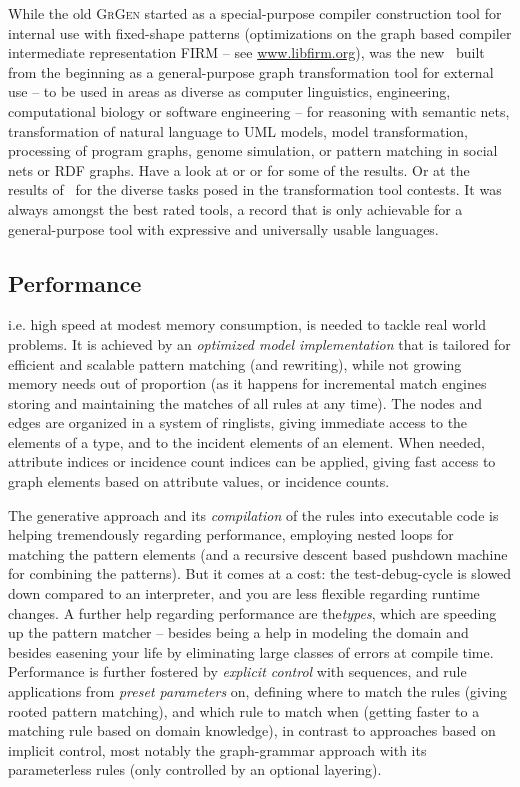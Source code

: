 While the old \textsc{GrGen} started as a special-purpose compiler construction tool for internal use with fixed-shape patterns 
(optimizations on the graph based compiler intermediate representation FIRM -- see \url{www.libfirm.org}),
was the new \GrG\ built from the beginning as a general-purpose graph transformation tool for external use
-- to be used in areas as diverse as computer linguistics, engineering, computational biology or software engineering --
for reasoning with semantic nets, transformation of natural language to UML models,
model transformation, processing of program graphs, genome simulation, or pattern matching in social nets or RDF graphs.
Have a look at \cite{usecomputerlinguistics} or \cite{usemodeltransformation} or \cite{usegeneexpression} for some of the results.
Or at the results of \GrG\ for the diverse tasks posed in the transformation tool contests. 
It was always amongst the best rated tools, a record that is only achievable for a general-purpose tool with expressive and universally usable languages.

\subsection*{Performance}
i.e. high speed at modest memory consumption, is needed to tackle real world problems.
It is achieved by an \emph{optimized model implementation} that is tailored for efficient and scalable pattern matching (and rewriting),
while not growing memory needs out of proportion (as it happens for incremental match engines storing and maintaining the matches of all rules at any time).
The nodes and edges are organized in a system of ringlists, giving immediate access to the elements of a type, and to the incident elements of an element.
When needed, attribute indices or incidence count indices can be applied, giving fast access to graph elements based on attribute values, or incidence counts.

The generative approach and its \emph{compilation} of the rules into executable code is helping tremendously regarding performance, employing nested loops for matching the pattern elements (and a recursive descent based pushdown machine for combining the patterns).
But it comes at a cost: the test-debug-cycle is slowed down compared to an interpreter, and you are less flexible regarding runtime changes.
A further help regarding performance are the\emph{types}, which are speeding up the pattern matcher
-- besides being a help in modeling the domain and besides easening your life by eliminating large classes of errors at compile time.
Performance is further fostered by \emph{explicit control} with sequences, and rule applications from \emph{preset parameters} on, defining where to match the rules (giving rooted pattern matching), and which rule to match when (getting faster to a matching rule based on domain knowledge), in contrast to approaches based on implicit control, most notably the graph-grammar approach with its parameterless rules (only controlled by an optional layering). 

